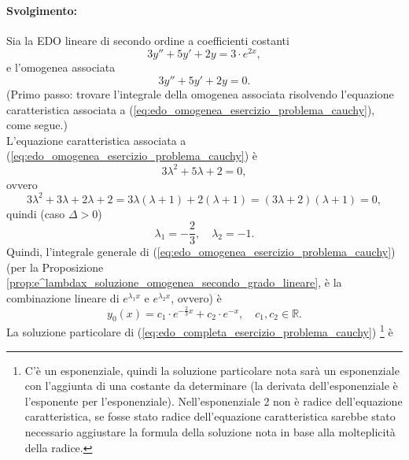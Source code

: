 \begin{example}
	\paragraph{Svolgimento:} Sia la EDO lineare di secondo ordine a coefficienti costanti
	\begin{equation}\label{eq:edo_completa_esercizio_problema_cauchy}
		3 y'' + 5 y' + 2 y = 3\cdot e^{2x},
	\end{equation}
	e l'omogenea associata
	\begin{equation}\label{eq:edo_omogenea_esercizio_problema_cauchy}
		3 y'' + 5 y' + 2 y = 0.
	\end{equation}
	(Primo passo: trovare l'integrale della omogenea associata risolvendo l'equazione caratteristica associata a (\ref{eq:edo_omogenea_esercizio_problema_cauchy}), come segue.)\\
	L'equazione caratteristica associata a (\ref{eq:edo_omogenea_esercizio_problema_cauchy}) è
	\begin{equation*}
		3\lambda^2 + 5 \lambda + 2 = 0,
	\end{equation*}
	ovvero
	\begin{equation*}
		3\lambda ^2 + 3\lambda + 2\lambda + 2 = 3\lambda(\lambda +1) + 2(\lambda + 1)=(3 \lambda +2)(\lambda +1)=0,
	\end{equation*}
	quindi (caso $\Delta>0$)
	\begin{equation*}
		\lambda_1 = -\frac{2}{3},\quad \lambda_2 = -1.
	\end{equation*}
	Quindi, l'integrale generale di (\ref{eq:edo_omogenea_esercizio_problema_cauchy}) (per la Proposizione \ref{prop:e^lambdax_soluzione_omogenea_secondo_grado_lineare}, è la combinazione lineare di $e^{\lambda_1 x}$ e $e^{\lambda_2 x}$, ovvero) è
	\begin{equation*}
		y_0(x)=c_1\cdot e^{-\frac{2}{3}x} + c_2 \cdot e^{-x},\quad c_1,c_2\in\mathbb{R}.
	\end{equation*}
	La soluzione particolare di (\ref{eq:edo_completa_esercizio_problema_cauchy}) \footnote{C'è un esponenziale, quindi la soluzione particolare nota sarà un esponenziale con l'aggiunta di una costante da determinare (la derivata dell'esponenziale è l'esponente per l'esponenziale). Nell'esponenziale 2 non è radice dell'equazione caratteristica, se fosse stato radice dell'equazione caratteristica sarebbe stato necessario aggiustare la formula della soluzione nota in base alla molteplicità della radice.} è
	\begin{equation}\label{eq:soluzione_particolare_non_omogenea_icognita}

\end{equation}
\end{example}
